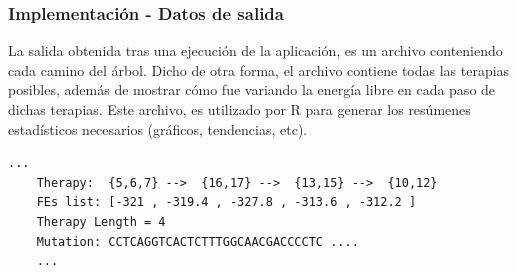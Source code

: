 \documentclass[xcolor=pdftex,dvipsnames,table,10pt,babel,spanish]{beamer}
\begin{document}



\begin{frame}[fragile]
    \frametitle{Implementaci\'on - Datos de salida}
      La salida obtenida tras una ejecuci\'on de la aplicaci\'on, es un archivo conteniendo cada camino del \'arbol. Dicho de otra forma, el archivo contiene todas las terapias posibles, adem\'as de mostrar c\'omo fue variando la energ\'ia libre en cada paso de dichas terapias. Este archivo, es utilizado por R para generar los res\'umenes estad\'isticos necesarios (gr\'aficos, tendencias, etc).
\scriptsize
      \begin{lstlisting}[basicstyle=\tt, frame=trBL, tabsize=4] 
	...
	Therapy:  {5,6,7} -->  {16,17} -->  {13,15} -->  {10,12}
	FEs list: [-321 , -319.4 , -327.8 , -313.6 , -312.2 ]
	Therapy Length = 4
	Mutation: CCTCAGGTCACTCTTTGGCAACGACCCCTC .... 
	...
      \end{lstlisting}
    \normalsize
\end{frame}
\end{document}
